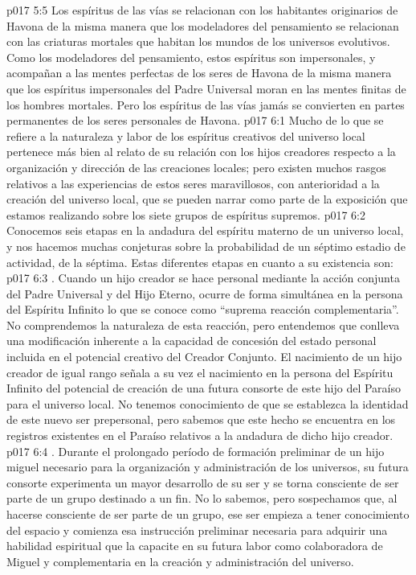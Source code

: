 \vs p017 5:5 Los espíritus de las vías se relacionan con los habitantes originarios de Havona de la misma manera que los modeladores del pensamiento se relacionan con las criaturas mortales que habitan los mundos de los universos evolutivos. Como los modeladores del pensamiento, estos espíritus son impersonales, y acompañan a las mentes perfectas de los seres de Havona de la misma manera que los espíritus impersonales del Padre Universal moran en las mentes finitas de los hombres mortales. Pero los espíritus de las vías jamás se convierten en partes permanentes de los seres personales de Havona.
\vs p017 6:1 Mucho de lo que se refiere a la naturaleza y labor de los espíritus creativos del universo local pertenece más bien al relato de su relación con los hijos creadores respecto a la organización y dirección de las creaciones locales; pero existen muchos rasgos relativos a las experiencias de estos seres maravillosos, con anterioridad a la creación del universo local, que se pueden narrar como parte de la exposición que estamos realizando sobre los siete grupos de espíritus supremos.
\vs p017 6:2 \pc Conocemos seis etapas en la andadura del espíritu materno de un universo local, y nos hacemos muchas conjeturas sobre la probabilidad de un séptimo estadio de actividad, de la séptima. Estas diferentes etapas en cuanto a su existencia son:
\vs p017 6:3 . Cuando un hijo creador se hace personal mediante la acción conjunta del Padre Universal y del Hijo Eterno, ocurre de forma simultánea en la persona del Espíritu Infinito lo que se conoce como “suprema reacción complementaria”. No comprendemos la naturaleza de esta reacción, pero entendemos que conlleva una modificación inherente a la capacidad de concesión del estado personal incluida en el potencial creativo del Creador Conjunto. El nacimiento de un hijo creador de igual rango señala a su vez el nacimiento en la persona del Espíritu Infinito del potencial de creación de una futura consorte de este hijo del Paraíso para el universo local. No tenemos conocimiento de que se establezca la identidad de este nuevo ser prepersonal, pero sabemos que este hecho se encuentra en los registros existentes en el Paraíso relativos a la andadura de dicho hijo creador.
\vs p017 6:4 . Durante el prolongado período de formación preliminar de un hijo miguel necesario para la organización y administración de los universos, su futura consorte experimenta un mayor desarrollo de su ser y se torna consciente de ser parte de un grupo destinado a un fin. No lo sabemos, pero sospechamos que, al hacerse consciente de ser parte de un grupo, ese ser empieza a tener conocimiento del espacio y comienza esa instrucción preliminar necesaria para adquirir una habilidad espiritual que la capacite en su futura labor como colaboradora de Miguel y complementaria en la creación y administración del universo.

